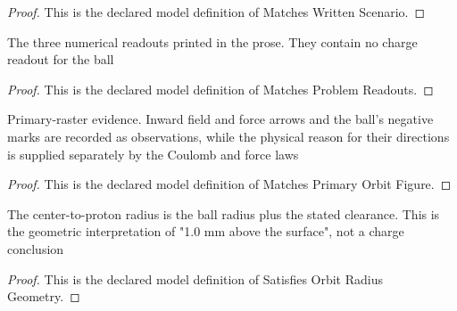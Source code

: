 \begin{proof}
  This is the declared model definition of Matches Written Scenario.
\end{proof}
\begin{definition}
  \label{def:physics:phyx-mini-0912:phyxminiproblems-problemphyxmini0912-matchesproblemreadouts}
  The three numerical readouts printed in the prose. They contain no charge readout for the ball
\end{definition}
\begin{proof}
  This is the declared model definition of Matches Problem Readouts.
\end{proof}
\begin{definition}
  \label{def:physics:phyx-mini-0912:phyxminiproblems-problemphyxmini0912-matchesprimaryorbitfigure}
  Primary-raster evidence. Inward field and force arrows and the ball's negative marks are recorded as observations, while the physical reason for their directions is supplied separately by the Coulomb and force laws
\end{definition}
\begin{proof}
  This is the declared model definition of Matches Primary Orbit Figure.
\end{proof}
\begin{definition}
  \label{def:physics:phyx-mini-0912:phyxminiproblems-problemphyxmini0912-satisfiesorbitradiusgeometry}
  The center-to-proton radius is the ball radius plus the stated clearance. This is the geometric interpretation of "1.0 mm above the surface", not a charge conclusion
\end{definition}
\begin{proof}
  This is the declared model definition of Satisfies Orbit Radius Geometry.
\end{proof}
